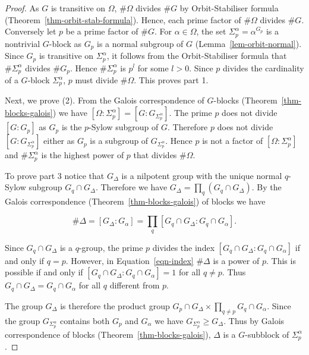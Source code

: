 \documentclass[11pt]{madras}%
\theoremstyle{remark}
\begin{document}
\begin{proof}
  As $G$ is transitive on $\Omega$, $\# \Omega$ divides $\# G$ by
  Orbit-Stabiliser formula (Theorem~\ref{thm-orbit-stab-formula}).
  Hence, each prime factor of $\# \Omega$ divides $\# G$. Conversely
  let $p$ be a prime factor of $\# G$.  For $\alpha \in \Omega$, the
  set $\Sigma_p^\alpha = \alpha^{G_p}$ is a nontrivial $G$-block as
  $G_p$ is a normal subgroup of $G$ (Lemma~\ref{lem-orbit-normal}).
  Since $G_p$ is transitive on $\Sigma_p^\alpha$, it follows from the
  Orbit-Stabiliser formula that $\# \Sigma_p^\alpha$ divides $\# G_p$.
  Hence $\# \Sigma_p^\alpha$ is $p^l$ for some $l > 0$. Since $p$
  divides the cardinality of a $G$-block $\Sigma_p^\alpha$, $p$ must
  divide $\# \Omega$. This proves part 1.

  Next, we prove (2). {From} the Galois correspondence of $G$-blocks
  (Theorem~\ref{thm-blocks-galois}) we have $[\Omega :
  \Sigma_p^\alpha] = [G : G_{\Sigma_p^\alpha}]$. The prime $p$ does
  not divide $[G:G_p]$ as $G_p$ is the $p$-Sylow subgroup of $G$.
  Therefore $p$ does not divide $[G: G_{\Sigma_p^\alpha}]$ either as
  $G_p$ is a subgroup of $G_{\Sigma_p^\alpha}$.  Hence $p$ is not a
  factor of $[\Omega:\Sigma^\alpha_p]$ and $\# \Sigma_p^\alpha$ is the
  highest power of $p$ that divides $\# \Omega$.

  To prove part 3 notice that $G_\Delta$ is a nilpotent group with the
  unique normal $q$-Sylow subgroup $G_q \cap G_\Delta$. Therefore we
  have $G_\Delta = \prod_q (G_q \cap G_\Delta)$. By the Galois
  correspondence (Theorem~\ref{thm-blocks-galois}) of blocks we have

  \begin{equation}\label{eqn-index}
    \# \Delta = [G_\Delta : G_\alpha ] = \prod_q [ G_q \cap G_\Delta : G_q \cap
    G_\alpha].
  \end{equation}

  Since $G_q \cap G_\Delta$ is a $q$-group, the prime $p$ divides the
  index $[G_q \cap G_\Delta : G_q \cap G_\alpha]$ if and only if $q =
  p$.  However, in Equation~\ref{eqn-index} $\# \Delta$ is a power of
  $p$.  This is possible if and only if $[G_q \cap G_\Delta :G_q \cap
  G_\alpha] = 1$ for all $q \neq p$. Thus $G_q \cap G_\Delta = G_q
  \cap G_\alpha$ for all $q$ different from $p$.

  The group $G_\Delta$ is therefore the product group $G_p \cap
  G_\Delta \times \prod_{q \neq p} G_q \cap G_\alpha$. Since the group
  $G_{\Sigma_p^\alpha}$ contains both $G_p$ and $G_\alpha$ we have
  $G_{\Sigma_p^\alpha} \geq G_\Delta$. Thus by Galois correspondence
  of blocks (Theorem~\ref{thm-blocks-galois}), $\Delta$ is a
  $G$-subblock of $\Sigma_p^\alpha$.
\end{proof}  
\end{document}
